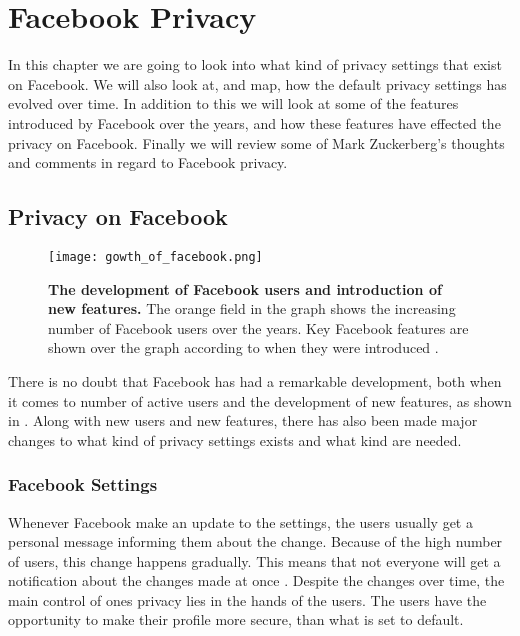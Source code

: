 \chapter{Facebook Privacy}
\label{chp:defaultprivacysettings} 

In this chapter we are going to look into what kind of privacy settings that exist on Facebook. We will also look at, and map, how the default privacy settings has evolved over time. In addition to this we will look at some of the features introduced by Facebook over the years, and how these features have effected the privacy on Facebook. Finally we will review some of Mark Zuckerberg's  thoughts and comments in regard to Facebook privacy. 


\section{Privacy on Facebook}\label{sec:privacy_on_facebook}

\begin{figure}[h!]
\centering
\texttt{[image: gowth\_of\_facebook.png]}
\caption[The development of Facebook users and introduction of new features]{\textbf{The development of Facebook users and introduction of new features.} The orange field in the graph shows the increasing number of Facebook users over the years. Key Facebook features are shown over the graph according to when they were introduced \cite{BBCFacebookGrowth}.} 
\label{fig:growth_of_facebook}
\end{figure}

There is no doubt that Facebook has had a remarkable development, both when it comes to number of active users and the development of new features, as shown in . Along with new users and new features, there has also been made major changes to what kind of privacy settings exists and what kind are needed. 


\subsection{Facebook Settings}
Whenever Facebook make an update to the settings, the users usually get a personal message informing them about the change. Because of the high number of users, this change happens gradually. This means that not everyone will get a notification about the changes made at once \cite{settingschangingagain}. Despite the changes over time, the main control of ones privacy lies in the hands of the users. The users have the opportunity to make their profile more secure, than what is set to default. 

